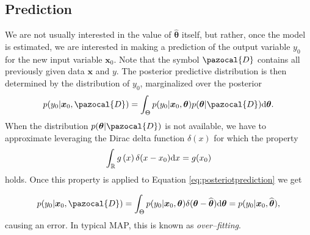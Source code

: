 \subsection{Prediction}
We are not usually interested in the value of $\widehat{\boldsymbol{\theta}}$ itself, but rather, once the model is estimated, we are interested in making a prediction of the output variable $y_0$ for the new input variable $\boldsymbol{x}_0$. Note that the symbol $\pazocal{D}$ contains all previously given data $\boldsymbol{x}$ and $y$. The posterior predictive distribution is then determined by the distribution of $y_0$, marginalized over the posterior
\begin{equation}
	p(y_0 | \boldsymbol{x}_0, \pazocal{D}) =   \int_{\Theta} p(y_0|\boldsymbol{x}_0, \boldsymbol{\theta}) p(\boldsymbol{\theta}|\pazocal{D}) \d\boldsymbol{\theta}.\label{eq:posteriotprediction}
\end{equation} 
When the distribution $p(\boldsymbol{\theta}|\pazocal{D})$ is not available, we have to approximate leveraging the Dirac delta function $\delta(x)$ for which the property
\begin{align}
    \int_{\mathbb{R}} g\left(x\right)\delta(x-x_0)\mathrm{d}{x} = g(x_0)
\end{align}
holds. Once this property is applied to Equation \eqref{eq:posteriotprediction} we get

\begin{equation}
p(y_0 | \boldsymbol{x}_0, \pazocal{D}) = \int_{\Theta} 	p(y_0|\boldsymbol{x}_0, \boldsymbol{\theta}) \delta(\boldsymbol{\theta} - \widehat{\boldsymbol{\theta}})\d\boldsymbol{\theta} = p(y_0|\boldsymbol{x}_0, \widehat{\boldsymbol{\theta}}),
\end{equation}
causing an error. In typical MAP, this is known as \emph{over--fitting}. 

 
